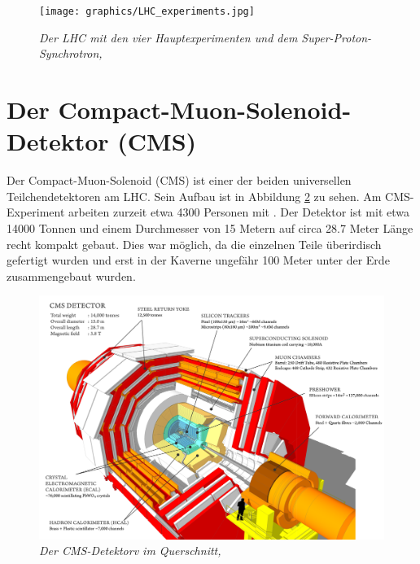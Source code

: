 \begin{figure}[hhh]
 \begin{center}
   \texttt{[image: graphics/LHC\_experiments.jpg]}
   \parbox[b]{12cm}{
     \caption[Large-Hadron-Collider]
             {\label{fig:LHC} \it\!Der LHC mit den vier Hauptexperimenten und dem Super-Proton-Synchrotron, \cite{Team:40525}}
   }
 \end{center}
\end{figure}

\section{Der Compact-Muon-Solenoid-Detektor (CMS)}
\label{ch:Experiment:sec:CMS}

Der Compact-Muon-Solenoid (CMS) ist einer der beiden universellen Teilchendetektoren am LHC. Sein Aufbau ist in Abbildung \ref{fig:cms_sectional} zu sehen. Am CMS-Experiment arbeiten zurzeit etwa 4300 Personen mit \cite{cms_people}. Der Detektor ist mit etwa \num{14000} Tonnen und einem Durchmesser von \num{15} Metern auf circa \num{28,7} Meter L\"ange recht kompakt gebaut. Dies war m\"oglich, da die einzelnen Teile \"uberirdisch gefertigt wurden und erst in der Kaverne ungef\"ahr \num{100} Meter unter der Erde zusammengebaut wurden.\\
\begin{figure}[hhh]
 \begin{center}
   \includegraphics[width=\textwidth]{graphics/cms_sectional.png}
   \parbox[b]{12cm}{
     \caption[CMS-Detektor]
             {\label{fig:cms_sectional} \it\!Der CMS-Detektorv im Querschnitt, \cite{cms_sectional}}
   }
 \end{center}
\end{figure}

